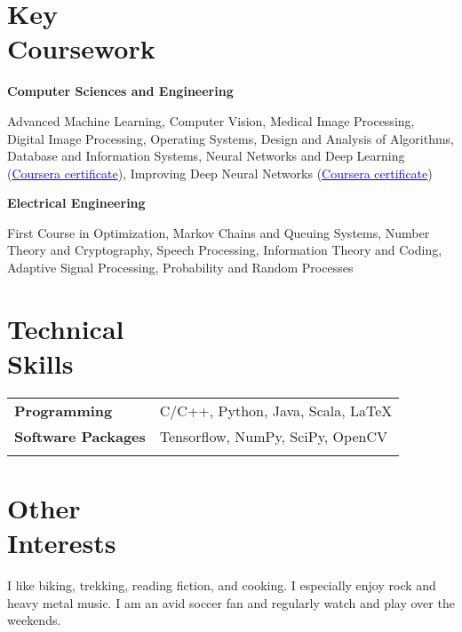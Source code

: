 \documentclass[margin,line,hidelinks]{res}
\newenvironment{list1}{
  \begin{list}{\ding{113}}{%
      \setlength{\itemsep}{0in}
      \setlength{\parsep}{0in} \setlength{\parskip}{0in}
      \setlength{\topsep}{0in} \setlength{\partopsep}{0in} 
      \setlength{\leftmargin}{0.17in}}}{\end{list}}
\begin{document}
\begin{resume}
\section{\sc Key \\Coursework} 
\begin{list1}
\item[\strut\hspace{0.5cm}\hypertarget{crselst}{\textbf{Computer Sciences and Engineering}}]
\item[] Advanced Machine Learning, Computer Vision, Medical Image Processing, Digital Image Processing, Operating Systems, Design and Analysis of Algorithms, Database and Information Systems, Neural Networks and Deep Learning (\href{https://www.coursera.org/account/accomplishments/certificate/EFCWGMGV337K}{\textcolor{blue}{Coursera certificate}}),  Improving Deep Neural Networks (\href{https://www.coursera.org/account/accomplishments/certificate/J78VLD3BAP5U}{\textcolor{blue}{Coursera certificate}})
\item[\strut\hspace{0.5cm}\textbf{Electrical Engineering}]
\vspace{0.05in}
\item[] First Course in Optimization, Markov Chains and Queuing Systems, Number Theory and Cryptography, Speech Processing, Information Theory and Coding, Adaptive Signal Processing, Probability and Random Processes
\end{list1}

\section{\sc Technical \\Skills} 
\begin{tabular}{@{}p{1.3in}p{4.3in}}
\textbf{Programming} & C/C++, Python, Java, Scala, \LaTeX \\  
\vspace*{-0.06in}
\textbf{Software Packages} & 
\vspace*{-0.06in}
Tensorflow, NumPy, SciPy, OpenCV\\ 
\vspace*{-0.06in} 
\end{tabular}


\section{\sc Other \\Interests}
I like biking, trekking, reading fiction, and cooking. I especially enjoy rock and heavy metal music. I am an avid soccer fan and regularly watch and play over the weekends.

\end{resume}
\end{document}
